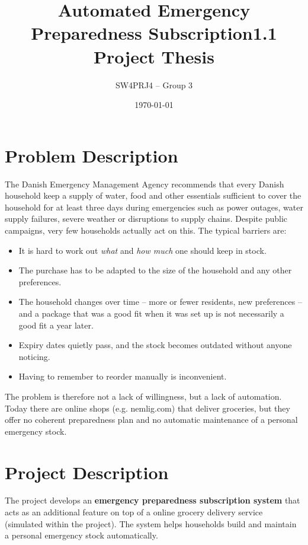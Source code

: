 \documentclass[11pt,a4paper]{article}
\title{\textbf{Automated Emergency Preparedness Subscription}}
\author{}
\date{}
\title{1.1 Project Thesis}
\author{SW4PRJ4 -- Group 3}
\date{\today}
\begin{document}
\maketitle
\vspace{-2\baselineskip}
\begin{center}




\vspace{1\baselineskip}
\section*{Problem Description}
The Danish Emergency Management Agency recommends that every Danish household keep a
supply of water, food and other essentials sufficient to cover the household for at
least three days during emergencies such as power outages, water supply failures,
severe weather or disruptions to supply chains. Despite public campaigns, very few
households actually act on this. The typical barriers are:
\begin{itemize}[nosep]
  \item It is hard to work out \emph{what} and \emph{how much} one should keep in stock.
  \item The purchase has to be adapted to the size of the household and any other preferences.
  \item The household changes over time -- more or fewer residents, new preferences -- and a package that was a good fit when it was set up is not necessarily a good fit a year later.
  \item Expiry dates quietly pass, and the stock becomes outdated without anyone noticing.
  \item Having to remember to reorder manually is inconvenient.
\end{itemize}
The problem is therefore not a lack of willingness, but a lack of automation. Today
there are online shops (e.g. nemlig.com) that deliver groceries, but they offer no
coherent preparedness plan and no automatic maintenance of a personal emergency stock.
\section*{Project Description}
The project develops an \textbf{emergency preparedness subscription system} that acts as
an additional feature on top of a online grocery delivery service (simulated within the project). The system helps
households build and maintain a personal emergency stock automatically.

\end{center}
\end{document}
